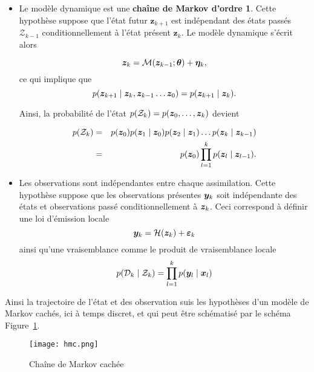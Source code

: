 \begin{itemize}
    \item Le modèle dynamique est une \textbf{chaîne de Markov d'ordre 1}. Cette hypothèse suppose que l'état futur $\bm z_{k+1}$ est indépendant des états passés $\mathcal Z_{k-1}$ conditionnellement à l'état présent $\bm z_{k}$. Le modèle dynamique s'écrit alors

          \begin{equation*}
              \bm z_k = \mathcal{M}(\bm z_{k-1} ; \bm \theta) + \bm \eta_k,
          \end{equation*}ce qui implique que
          \begin{equation*}
              p(\bz_{k+1} \mid \bz_{k},\bz_{k-1}\dots \bz_{0}) = p(\bz_{k+1} \mid \bz_{k}).
          \end{equation*}

          Ainsi, la probabilité de l'état $p(\mathcal{Z}_k)=p(\bm z_0, \dots, \bm z_k)$ devient

          \begin{eqnarray*}
              p(\mathcal{Z}_k) &=& p(\bm z_0) p(\bm z_1 \mid \bm z_0) p(\bm z_2 \mid \bm z_1) \dots p(\bm z_k \mid \bm z_{k-1}) \\
              &=& p(\bm z_0) \prod_{l = 1}^{k} p(\bm z_l \mid \bm z_{l-1}).
          \end{eqnarray*}

    \item Les observations sont indépendantes entre chaque assimilation. Cette hypothèse suppose que les observations présentes $\bm{y}_k$ soit indépendante des états et observations passé conditionnellement à $\bm z_k$. Ceci correspond à définir une loi d'émission locale
          \begin{equation*}
              \bm{y}_k = \mathcal H (\bm z_k) + \bm{\varepsilon}_k
          \end{equation*}
          ainsi qu'une vraisemblance comme le produit de vraisemblance locale
          \begin{equation*}
              p(\mathcal{D}_k \mid \mathcal Z_k) = \prod_{l=1}^{k} p(\bm{y}_l \mid \bm{x}_l)
          \end{equation*}
\end{itemize}

Ainsi la trajectoire de l'état et des observation suis les hypothèses d'un modèle de Markov cachés, ici à temps discret, et qui peut être schématisé par le schéma Figure~\ref{fig:hidden_markov}.

\begin{figure}[h]
    \centering
    \texttt{[image: hmc.png]}
    \caption{Chaîne de Markov cachée}
    \label{fig:hidden_markov}
\end{figure}

